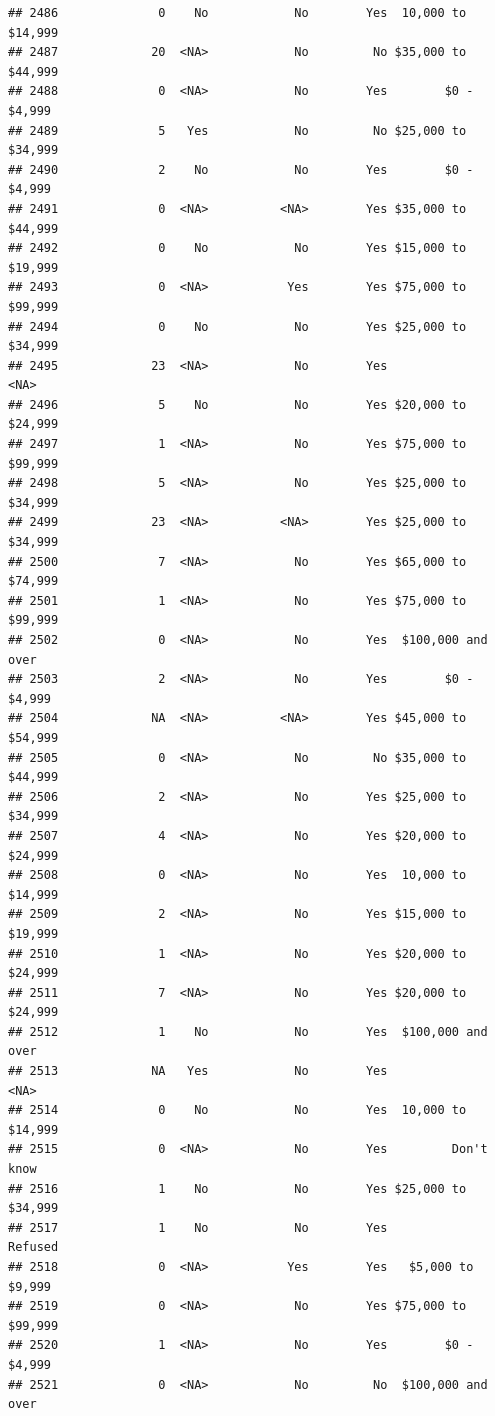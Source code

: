 \documentclass[man]{apa6}
\begin{document}
\begin{verbatim}
## 2486              0    No            No        Yes  10,000 to $14,999
## 2487             20  <NA>            No         No $35,000 to $44,999
## 2488              0  <NA>            No        Yes        $0 - $4,999
## 2489              5   Yes            No         No $25,000 to $34,999
## 2490              2    No            No        Yes        $0 - $4,999
## 2491              0  <NA>          <NA>        Yes $35,000 to $44,999
## 2492              0    No            No        Yes $15,000 to $19,999
## 2493              0  <NA>           Yes        Yes $75,000 to $99,999
## 2494              0    No            No        Yes $25,000 to $34,999
## 2495             23  <NA>            No        Yes               <NA>
## 2496              5    No            No        Yes $20,000 to $24,999
## 2497              1  <NA>            No        Yes $75,000 to $99,999
## 2498              5  <NA>            No        Yes $25,000 to $34,999
## 2499             23  <NA>          <NA>        Yes $25,000 to $34,999
## 2500              7  <NA>            No        Yes $65,000 to $74,999
## 2501              1  <NA>            No        Yes $75,000 to $99,999
## 2502              0  <NA>            No        Yes  $100,000 and over
## 2503              2  <NA>            No        Yes        $0 - $4,999
## 2504             NA  <NA>          <NA>        Yes $45,000 to $54,999
## 2505              0  <NA>            No         No $35,000 to $44,999
## 2506              2  <NA>            No        Yes $25,000 to $34,999
## 2507              4  <NA>            No        Yes $20,000 to $24,999
## 2508              0  <NA>            No        Yes  10,000 to $14,999
## 2509              2  <NA>            No        Yes $15,000 to $19,999
## 2510              1  <NA>            No        Yes $20,000 to $24,999
## 2511              7  <NA>            No        Yes $20,000 to $24,999
## 2512              1    No            No        Yes  $100,000 and over
## 2513             NA   Yes            No        Yes               <NA>
## 2514              0    No            No        Yes  10,000 to $14,999
## 2515              0  <NA>            No        Yes         Don't know
## 2516              1    No            No        Yes $25,000 to $34,999
## 2517              1    No            No        Yes            Refused
## 2518              0  <NA>           Yes        Yes   $5,000 to $9,999
## 2519              0  <NA>            No        Yes $75,000 to $99,999
## 2520              1  <NA>            No        Yes        $0 - $4,999
## 2521              0  <NA>            No         No  $100,000 and over

\end{verbatim}
\end{document}
